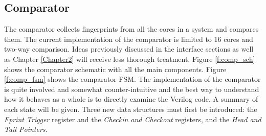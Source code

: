 \subsection{Comparator}
The comparator collects fingerprints from all the cores in a system and compares them. The current implementation of the comparator is limited to 16 cores and two-way comparison. Ideas previously discussed in the interface sections as well as Chapter \ref{Chapter2} will receive less thorough treatment. Figure \ref{f:comp_sch} shows the comparator schematic with all the main components. Figure \ref{f:comp_fsm} shows the comparator FSM. The implementation of the comparator is quite involved and somewhat counter-intuitive and the best way to understand how it behaves as a whole is to directly examine the Verilog code. A summary of each state will be given. Three new data structures must first be introduced: the \emph{Fprint Trigger} register and the \emph{Checkin and Checkout} registers, and the \emph{Head and Tail Pointers}.

